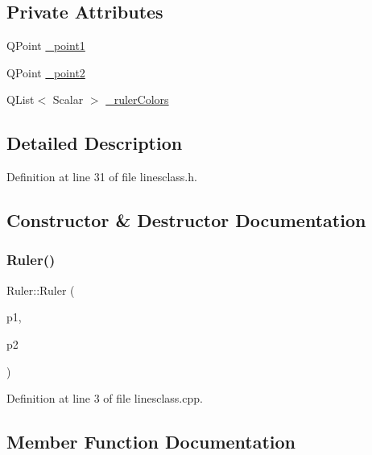 \subsection*{Private Attributes}
\begin{DoxyCompactItemize}
\item 
Q\+Point \mbox{\hyperlink{class_ruler_ae0b82ebbe2c601703de75c6aed392ed3}{\+\_\+point1}}
\item 
Q\+Point \mbox{\hyperlink{class_ruler_aa33c51b7768f1852bea7389502079048}{\+\_\+point2}}
\item 
Q\+List$<$ Scalar $>$ \mbox{\hyperlink{class_ruler_afa7fe69c326cc41b1ae71a8c69e41559}{\+\_\+ruler\+Colors}}
\end{DoxyCompactItemize}


\subsection{Detailed Description}


Definition at line 31 of file linesclass.\+h.



\subsection{Constructor \& Destructor Documentation}
\mbox{\label{class_ruler_a9e0723f35460c16a91ee88278982e3e9}} 
\subsubsection{\texorpdfstring{Ruler()}{Ruler()}}
{\footnotesize\ttfamily Ruler\+::\+Ruler (\begin{DoxyParamCaption}\item[{Q\+Point}]{p1,  }\item[{Q\+Point}]{p2 }\end{DoxyParamCaption})}



Definition at line 3 of file linesclass.\+cpp.



\subsection{Member Function Documentation}
\mbox{\label{class_ruler_aa86402b06c3d92112d49ca41e65b1897}} 
